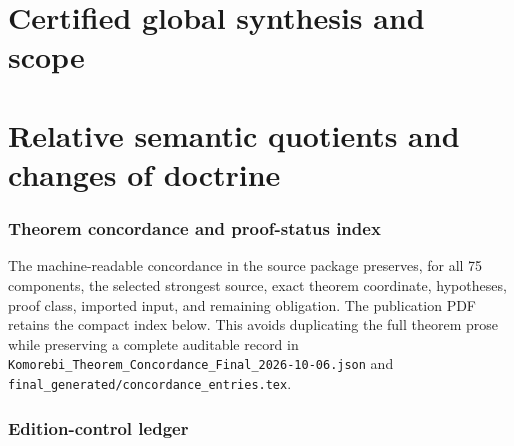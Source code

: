 \documentclass[11pt]{article}
\theoremstyle{definition}
\theoremstyle{remark}
\begin{document}








\part{Certified global synthesis and scope}







\part{Relative semantic quotients and changes of doctrine}










\appendix

\section{Theorem concordance and proof-status index}
\label{app:full-concordance}

The machine-readable concordance in the source package preserves, for all 75 components, the selected strongest source, exact theorem coordinate, hypotheses, proof class, imported input, and remaining obligation.  The publication PDF retains the compact index below.  This avoids duplicating the full theorem prose while preserving a complete auditable record in \nolinkurl{Komorebi_Theorem_Concordance_Final_2026-10-06.json} and \nolinkurl{final_generated/concordance_entries.tex}.



\clearpage
\section{Edition-control ledger}

\end{document}
